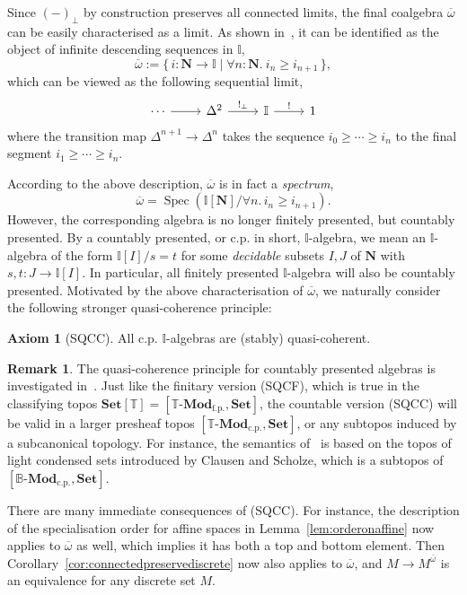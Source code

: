 \documentclass[12pt]{amsart}
\theoremstyle{definition}
\newtheorem{remark}[theorem]{Remark}
\newtheorem*{axiom}{Axiom}
\newcommand{\mb}[1]{\mathbf{#1}}
\newcommand{\mbb}[1]{\mathbb{#1}}
\newcommand{\T}{\mbb T}
\newcommand{\I}{\mbb I}
\newcommand{\mr}[1]{\mathrm{#1}}
\newcommand{\Set}{\mb{Set}}
\newcommand{\ov}[1]{\overline{#1}}
\newcommand{\scomp}[2]{\{\,#1\mid#2\,\}}
\newcommand{\fp}{_{\mr{f.p.}}}
\newcommand{\cp}{_{\mr{c.p.}}}
\newcommand{\N}{\mb N}
\newcommand{\prt}{_{\bot}}
\newcommand{\fa}[2]{\forall #1\!\colon\!\!#2.\ }
\newcommand{\mmod}[1]{#1\text{-}\mathbf{Mod}}
\newcommand{\spec}{\operatorname{Spec}}
\begin{document}
Since $(-)\prt$ by construction preserves all connected limits, the final coalgebra $\ov\omega$ can be easily characterised as a limit. As shown in~\cite{hyland2006first}, it can be identified as the object of infinite descending sequences in $\I$,
\[ \ov\omega := \scomp{i : \N \to \I}{\fa n\N i_n \ge i_{n+1}}, \]
which can be viewed as the following sequential limit,
\[
\begin{tikzcd}
  \cdots \ar[r] & \Delta^2 \ar[r, "!\prt"] & \I \ar[r, "!"] & 1
\end{tikzcd}
\]
where the transition map $\Delta^{n+1} \to \Delta^n$ takes the sequence $i_0 \ge \cdots \ge i_n$ to the final segment $i_1 \ge \cdots \ge i_n$. 

According to the above description, $\ov\omega$ is in fact a \emph{spectrum},
\[ \ov\omega = \spec(\I[\N]/\forall n.\, i_n \ge i_{n+1}). \]
However, the corresponding algebra is no longer finitely presented, but countably presented. By a countably presented, or c.p. in short, $\I$-algebra, we mean an $\I$-algebra of the form $\I[I]/s=t$ for some \emph{decidable} subsets $I,J$ of $\N$ with $s,t : J \to \I[I]$. In particular, all finitely presented $\I$-algebra will also be countably presented. Motivated by the above characterisation of $\ov\omega$, we naturally consider the following stronger quasi-coherence principle:

\begin{axiom}[SQCC]
  All c.p. $\I$-algebras are (stably) quasi-coherent.
\end{axiom}

\begin{remark}
  The quasi-coherence principle for countably presented algebras is investigated in~\cite{cherubini2024foundation}. Just like the finitary version (SQCF), which is true in the classifying topos $\Set[\T] = [\mmod\T\fp,\Set]$, the countable version (SQCC) will be valid in a larger presheaf topos $[\mmod\T\cp,\Set]$, or any subtopos induced by a subcanonical topology. For instance, the semantics of~\cite{cherubini2024foundation} is based on the topos of light condensed sets introduced by Clausen and Scholze, which is a subtopos of $[\mmod{\mbb B}\cp,\Set]$.
\end{remark}

There are many immediate consequences of (SQCC). For instance, the description of the specialisation order for affine spaces in Lemma~\ref{lem:orderonaffine} now applies to $\ov\omega$ as well, which implies it has both a top and bottom element. Then Corollary~\ref{cor:connectedpreservediscrete} now also applies to $\ov\omega$, and $M \to M^{\ov\omega}$ is an equivalence for any discrete set $M$. 
\end{document}
